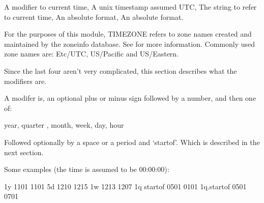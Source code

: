 \documentclass[letterpaper,10pt,english]{sphinxmanual}
\begin{document}
\begin{sphinxVerbatim}[commandchars=\\\{\}]
A modifier to current  time,
A unix timestamp assumed  UTC,
The string  to refer to current  time,
An absolute    format,
An absolute    format.
\end{sphinxVerbatim}

\sphinxAtStartPar
For the purposes of this module, TIMEZONE refers to zone names
created and maintained by the zoneinfo database.
See  for more information.
Commonly used zone names are: Etc/UTC, US/Pacific and US/Eastern.

\sphinxAtStartPar
Since the last four aren’t very complicated, this section describes
what the modifiers are.

\sphinxAtStartPar
A modifer is, an optional plus or minus sign followed by a number,
and then one of:

\begin{sphinxVerbatim}[commandchars=\\\{\}]
  year,   quarter ,   month,   week,   day,   hour
\end{sphinxVerbatim}

\sphinxAtStartPar
Followed optionally by a space or a period and ‘startof’.
Which is described in the next section.

\sphinxAtStartPar
Some examples (the time is assumed to be 00:00:00):

\begin{sphinxVerbatim}[commandchars=\\\{\}]
\PYGZhy{}1y         \PYGZhy{}11\PYGZhy{}01 \PYGZhy{}\PYGZgt{} \PYGZhy{}11\PYGZhy{}01
 5d         \PYGZhy{}12\PYGZhy{}10 \PYGZhy{}\PYGZgt{} \PYGZhy{}12\PYGZhy{}15
\PYGZhy{}1w         \PYGZhy{}12\PYGZhy{}13 \PYGZhy{}\PYGZgt{} \PYGZhy{}12\PYGZhy{}07
\PYGZhy{}1q startof \PYGZhy{}05\PYGZhy{}01 \PYGZhy{}\PYGZgt{} \PYGZhy{}01\PYGZhy{}01
 1q.startof \PYGZhy{}05\PYGZhy{}01 \PYGZhy{}\PYGZgt{} \PYGZhy{}07\PYGZhy{}01
\end{sphinxVerbatim}
\end{document}
